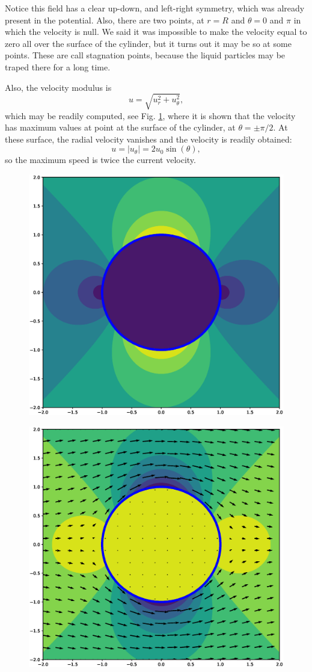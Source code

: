 Notice this field has a clear up-down, and left-right symmetry, which
was already present in the potential. Also, there are two points, at
$r=R$ and $\theta=0$ and $\pi$ in which the velocity is null. We said
it was impossible to make the velocity equal to zero all over the
surface of the cylinder, but it turns out it may be so at some
points. These are call stagnation points, because the liquid particles
may be traped there for a long time.

Also, the velocity modulus is
\[
u = \sqrt{ u_r^2 + u_\theta^2}  ,
\]
which may be readily computed, see
Fig. \ref{fig:potential_flow_past_cylinder_vel}, where it is shown
that the velocity has maximum values at point at the surface of the
cylinder, at $\theta=\pm \pi/2$. At these surface, the radial velocity
vanishes and the velocity is readily obtained:
\[
u = |u_\theta| = 2 u_0  \sin(\theta) ,
\]
so the maximum speed is twice the current velocity.


\begin{figure}
  \centering
  \includegraphics[width=0.4\linewidth]{figures/potential_flow_past_cylinder_vel}
  \caption{\label{fig:potential_flow_past_cylinder_vel}}
\end{figure}


\begin{figure}
  \centering
  \includegraphics[width=0.4\linewidth]{figures/potential_flow_past_cylinder_vel_p}
  \caption{}%
\end{figure}


